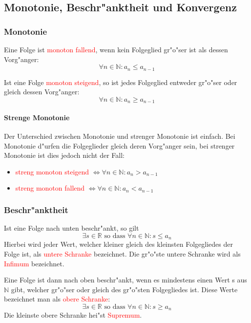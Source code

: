 \subsection{Monotonie, Beschr"anktheit und Konvergenz}
\subsubsection{Monotonie}
Eine Folge ist \textcolor{red}{monoton fallend}, wenn kein Folgeglied gr"o"ser ist als dessen Vorg"anger:
\begin{equation*}
\forall n \in \mathbb{N} : a_n \leq a_{n-1}
\end{equation*}

Ist eine Folge \textcolor{red}{monoton steigend}, so ist jedes Folgeglied entweder gr"o"ser oder gleich dessen Vorg"anger:
\begin{equation*}
\forall n\in{\mathbb{N}}: a_n \geq a_{n-1}
\end{equation*}

\paragraph{Strenge Monotonie} 
Der Unterschied zwischen Monotonie und strenger Monotonie ist einfach. Bei Monotonie d"urfen die Folgeglieder gleich deren Vorg"anger sein, bei strenger Monotonie ist dies jedoch nicht der Fall:
\begin{itemize}
\item \textcolor{red}{streng monoton steigend} $\Leftrightarrow \forall n\in\mathbb{N}: a_n > a_{n-1}$
\item \textcolor{red}{streng monoton fallend} $\Leftrightarrow \forall n\in\mathbb{N}: a_n < a_{n-1}$
\end{itemize}

\subsubsection{Beschr"anktheit}
Ist eine Folge nach unten beschr"ankt, so gilt
\begin{equation*}
\exists s \in \mathbb{R} \text{ so dass } \forall n \in \mathbb{N}: s \leq a_n
\end{equation*}
Hierbei wird jeder Wert, welcher kleiner gleich des kleinsten Folgegliedes der Folge ist, als \textcolor{red}{untere Schranke} bezeichnet. Die gr"o"ste untere Schranke wird als \textcolor{red}{Infimum} bezeichnet.

Eine Folge ist dann nach oben beschr"ankt, wenn es mindestens einen Wert s aus $\mathbb{N}$ gibt, welcher gr"o"ser oder gleich des gr"o"sten Folgegliedes ist. Diese Werte bezeichnet man als \textcolor{red}{obere Schranke}:
\begin{equation*}
\exists s \in \mathbb{R} \text{ so dass } \forall n \in \mathbb{N} : s\geq a_n 
\end{equation*}
Die kleinste obere Schranke hei"st \textcolor{red}{Supremum}.

